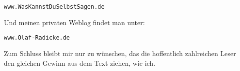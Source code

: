\begin{center}
\texttt{www.WasKannstDuSelbstSagen.de}
\end{center}

Und meinen privaten Weblog findet man unter:

\begin{center}
\texttt{www.Olaf-Radicke.de}
\end{center}

Zum Schluss bleibt mir nur zu wünschen, das die hoffentlich zahlreichen Leser
den gleichen Gewinn aus dem Text ziehen, wie ich.




